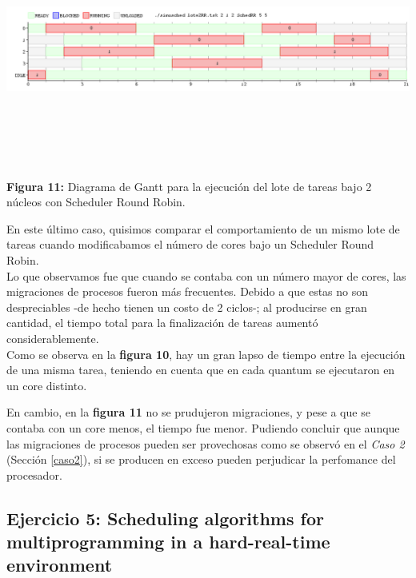 \documentclass[a4paper]{article}
\begin{document}
 \includegraphics[width=\textwidth,height=3.0in,keepaspectratio]{imagenes/ej4/eje6.png} \\
\begin {flushleft}
\textbf{Figura 11:} Diagrama de Gantt para la ejecuci\'on del lote de tareas bajo 2 n\'ucleos con Scheduler Round Robin.
\end{flushleft}
 
\bigskip 

En este último caso, quisimos comparar el comportamiento de un mismo lote de tareas cuando modificabamos el número de cores bajo un Scheduler Round Robin.\\

 Lo que observamos fue que cuando se contaba con un número mayor de cores, las migraciones de procesos fueron m\'as frecuentes. Debido a que estas no son despreciables -de hecho tienen un costo de 2 ciclos-; al producirse en gran cantidad, el tiempo total para la finalización de tareas aumentó considerablemente. \\
 
 Como se observa en la \textbf{figura 10}, hay un gran lapso de tiempo entre la ejecución de una misma tarea, teniendo en cuenta que en cada quantum se ejecutaron en un core distinto. 
 
 En cambio, en la \textbf{figura 11} no se prudujeron migraciones, y pese a que se contaba con un core menos, el tiempo fue menor. Pudiendo concluir que aunque las migraciones de procesos pueden ser provechosas como se observó en el \emph{Caso 2} (Secci\'on \ref{caso2}), si se producen en exceso pueden perjudicar la perfomance del procesador.  

\newpage

 \subsection{Ejercicio 5: Scheduling algorithms for multiprogramming in a hard-real-time environment}
 
\end{document}
